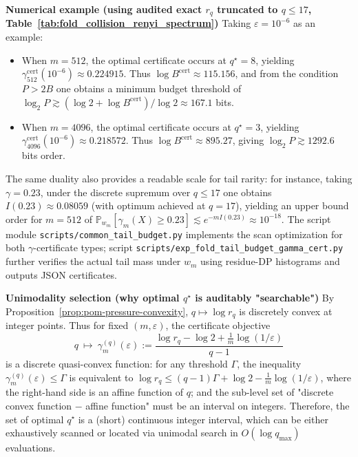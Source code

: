\begin{remark}
\medskip\noindent\textbf{Numerical example (using audited exact \texorpdfstring{$r_q$}{rq} truncated to $q\le 17$, Table~\ref{tab:fold_collision_renyi_spectrum})}
Taking $\varepsilon=10^{-6}$ as an example:
\begin{itemize}
  \item When $m=512$, the optimal certificate occurs at $q^\star=8$, yielding $\gamma^{\mathrm{cert}}_{512}(10^{-6})\approx 0.224915$.
  Thus $\log B^{\mathrm{cert}}\approx 115.156$, and from the condition $P>2B$ one obtains a minimum budget threshold of
  $\log_2 P\gtrsim (\log 2+\log B^{\mathrm{cert}})/\log 2\approx 167.1$ bits.
  \item When $m=4096$, the optimal certificate occurs at $q^\star=3$, yielding $\gamma^{\mathrm{cert}}_{4096}(10^{-6})\approx 0.218572$.
  Thus $\log B^{\mathrm{cert}}\approx 895.27$, giving $\log_2 P\gtrsim 1292.6$ bits order.
\end{itemize}
The same duality also provides a readable scale for tail rarity: for instance, taking $\gamma=0.23$, under the discrete supremum over $q\le 17$ one obtains
$I(0.23)\approx 0.08059$ (with optimum achieved at $q=17$), yielding an upper bound order for $m=512$ of
$\mathbb{P}_{w_m}[\gamma_m(X)\ge 0.23]\lesssim e^{-m I(0.23)}\approx 10^{-18}$.
The script module \texttt{scripts/common\_tail\_budget.py} implements the scan optimization for both $\gamma$-certificate types;
script \texttt{scripts/exp\_fold\_tail\_budget\_gamma\_cert.py} further verifies the actual tail mass under $w_m$ using residue-DP histograms and outputs JSON certificates.
\par
\medskip\noindent\textbf{Unimodality selection (why optimal $q^\star$ is auditably "searchable")}
By Proposition~\ref{prop:pom-pressure-convexity}, $q\mapsto \log r_q$ is discretely convex at integer points.
Thus for fixed $(m,\varepsilon)$, the certificate objective
\[
q\ \longmapsto\ \gamma^{(q)}_{m}(\varepsilon)
:=\frac{\log r_q-\log 2+\frac{1}{m}\log(1/\varepsilon)}{q-1}
\]
is a discrete quasi-convex function: for any threshold $\Gamma$, the inequality $\gamma^{(q)}_m(\varepsilon)\le \Gamma$ is equivalent to
\(
\log r_q \le (q-1)\Gamma+\log 2-\frac{1}{m}\log(1/\varepsilon)
\),
where the right-hand side is an affine function of $q$; and the sub-level set of "discrete convex function $-$ affine function" must be an interval on integers.
Therefore, the set of optimal $q^\star$ is a (short) continuous integer interval, which can be either exhaustively scanned or located via unimodal search in $O(\log q_{\max})$ evaluations.


\end{remark}
